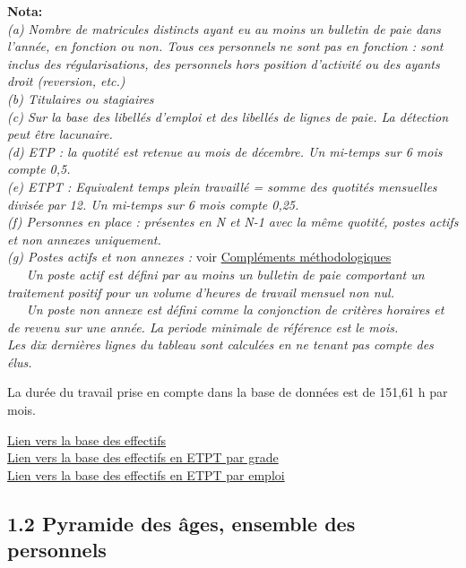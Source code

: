 \textbf{Nota:}\\
\emph{(a) Nombre de matricules distincts ayant eu au moins un bulletin
de paie dans l'année, en fonction ou non. Tous ces personnels ne sont
pas en fonction : sont inclus des régularisations, des personnels hors
position d'activité ou des ayants droit (reversion, etc.)}\\
\emph{(b) Titulaires ou stagiaires}\\
\emph{(c) Sur la base des libellés d'emploi et des libellés de lignes de
paie. La détection peut être lacunaire.}\\
\emph{(d) ETP : la quotité est retenue au mois de décembre. Un mi-temps
sur 6 mois compte 0,5.}\\
\emph{(e) ETPT : Equivalent temps plein travaillé = somme des quotités
mensuelles divisée par 12. Un mi-temps sur 6 mois compte 0,25.}\\
\emph{(f) Personnes en place : présentes en N et N-1 avec la même
quotité, postes actifs et non annexes uniquement.}\\
\emph{(g) Postes actifs et non annexes :} voir
\href{../Docs/méthodologie.pdf}{Compléments méthodologiques}\\
\emph{~~~Un poste actif est défini par au moins un bulletin de paie
comportant un traitement positif pour un volume d'heures de travail
mensuel non nul.}\\
\emph{~~~Un poste non annexe est défini comme la conjonction de critères
horaires et de revenu sur une année. La periode minimale de référence
est le mois.}\\
\emph{Les dix dernières lignes du tableau sont calculées en ne tenant
pas compte des élus.}

La durée du travail prise en compte dans la base de données est de
151,61 h par mois.

\href{../Bases/Effectifs/tableau.effectifs.csv}{Lien vers la base des
effectifs}\\
\href{../Bases/Effectifs/tableau.effectifs.grades.csv}{Lien vers la base
des effectifs en ETPT par grade}\\
\href{../Bases/Effectifs/tableau.effectifs.emplois.csv}{Lien vers la base
des effectifs en ETPT par emploi}

\hypertarget{pyramide-des-ages-ensemble-des-personnels}{%
\subsection{1.2 Pyramide des âges, ensemble des
personnels}\label{pyramide-des-ages-ensemble-des-personnels}}

